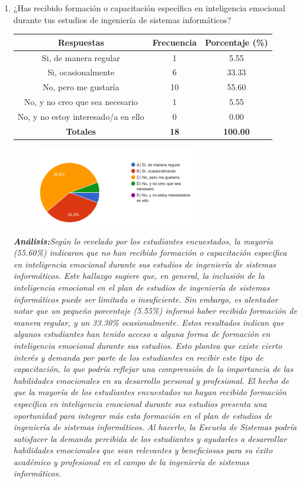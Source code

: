 \documentclass[journal]{IEEEtran}
\begin{document}
\begin{enumerate}
\item ¿Has recibido formación o capacitación específica en inteligencia emocional durante tus estudios de ingeniería de sistemas informáticos?
	\begin{table}[H]
		\renewcommand{\arraystretch}{1.3}
		\centering
		\begin{tabular}{|c|c|c|}
			\hline
			\textbf{Respuestas} & \textbf{Frecuencia} & \textbf{Porcentaje (\%)}\\
			\hline
			Si, de manera regular & 1 & 5.55 \\
			Si, ocasionalmente & 6 & 33.33 \\
			No, pero me gustaría & 10 & 55.60\\
			No, y no creo que sea necesario & 1 & 5.55\\
			No, y no estoy interesado/a en ello & 0 & 0.00\\
			\hline
			\textbf{Totales} &\textbf{18}& \textbf{100.00}\\
			\hline
		\end{tabular}
	\end{table}
	\begin{figure}[h]
		\centering
		\includegraphics[width=07cm]{Pregunta 6}
	\end{figure}
	\textit{\textbf{Análisis:}Según lo revelado por los estudiantes encuestados, la mayoría (55.60\%) indicaron que no han recibido formación o capacitación específica en inteligencia emocional durante sus estudios de ingeniería de sistemas informáticos. Este hallazgo sugiere que, en general, la inclusión de la inteligencia emocional en el plan de estudios de ingeniería de sistemas informáticos puede ser limitada o insuficiente.
Sin embargo, es alentador notar que un pequeño porcentaje (5.55\%) informó haber recibido formación de manera regular, y un 33.30\% ocasionalmente. Estos resultados indican que algunos estudiantes han tenido acceso a alguna forma de formación en inteligencia emocional durante sus estudios. Esto plantea que existe cierto interés y demanda por parte de los estudiantes en recibir este tipo de capacitación, lo que podría reflejar una comprensión de la importancia de las habilidades emocionales en su desarrollo personal y profesional.
El hecho de que la mayoría de los estudiantes encuestados no hayan recibido formación específica en inteligencia emocional durante sus estudios presenta una oportunidad para integrar más esta formación en el plan de estudios de ingeniería de sistemas informáticos. Al hacerlo, la Escuela de Sistemas podría satisfacer la demanda percibida de los estudiantes y ayudarles a desarrollar habilidades emocionales que sean relevantes y beneficiosas para su éxito académico y profesional en el campo de la ingeniería de sistemas informáticos.
}\\


\end{enumerate}
\end{document}
